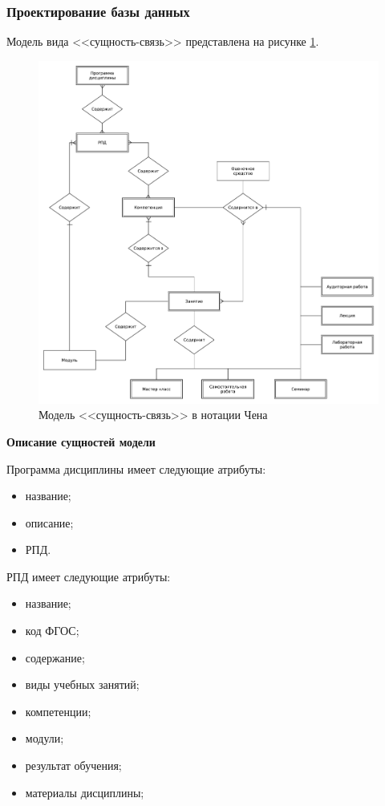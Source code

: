 \subsubsection{Проектирование базы данных}

Модель вида <<сущность-связь>> \cite{er-chen} представлена на рисунке \ref{img:er}.

\clearpage

\begin{figure}[h!]
	\begin{center}
		\includegraphics[scale=0.47]{inc/img/er.pdf}
	\end{center}
	\captionsetup{justification=centering}
	\caption{Модель <<сущность-связь>> в нотации Чена}
	\label{img:er}
\end{figure}

\noindent\textbf{Описание сущностей модели}

Программа дисциплины имеет следующие атрибуты:
\begin{itemize}
	\item название;
	\item описание;
	\item РПД.
\end{itemize}

\clearpage

РПД имеет следующие атрибуты:
\begin{itemize}
	\item название;
	\item код ФГОС;
	\item содержание;
	\item виды учебных занятий;
	\item компетенции;
	\item модули;
	\item результат обучения;
	\item материалы дисциплины;
\end{itemize}


